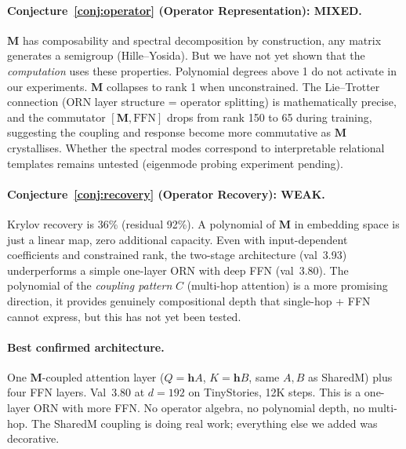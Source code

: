 \documentclass[11pt, a4paper]{article}
\newcommand{\M}{\mathbf{M}}
\newcommand{\h}{\mathbf{h}}
\theoremstyle{plain}
\theoremstyle{definition}
\theoremstyle{remark}
\begin{document}
\paragraph{Conjecture~\ref{conj:operator} (Operator Representation): MIXED.}
$\M$ has composability and spectral decomposition by construction, any matrix generates a semigroup (Hille--Yosida).
But we have not yet shown that the \emph{computation} uses these properties.
Polynomial degrees above 1 do not activate in our experiments.
$\M$ collapses to rank 1 when unconstrained.
The Lie--Trotter connection (ORN layer structure = operator splitting) is mathematically precise, and the commutator $[\M, \mathrm{FFN}]$ drops from rank 150 to 65 during training, suggesting the coupling and response become more commutative as $\M$ crystallises.
Whether the spectral modes correspond to interpretable relational templates remains untested (eigenmode probing experiment pending).

\paragraph{Conjecture~\ref{conj:recovery} (Operator Recovery): WEAK.}
Krylov recovery is 36\% (residual 92\%).
A polynomial of $\M$ in embedding space is just a linear map, zero additional capacity.
Even with input-dependent coefficients and constrained rank, the two-stage architecture (val~3.93) underperforms a simple one-layer ORN with deep FFN (val~3.80).
The polynomial of the \emph{coupling pattern} $C$ (multi-hop attention) is a more promising direction, it provides genuinely compositional depth that single-hop + FFN cannot express, but this has not yet been tested.

\paragraph{Best confirmed architecture.}
One $\M$-coupled attention layer ($Q = \h A$, $K = \h B$, same $A, B$ as SharedM) plus four FFN layers.
Val~3.80 at $d = 192$ on TinyStories, 12K steps.
This is a one-layer ORN with more FFN.
No operator algebra, no polynomial depth, no multi-hop.
The SharedM coupling is doing real work; everything else we added was decorative.
\end{document}
